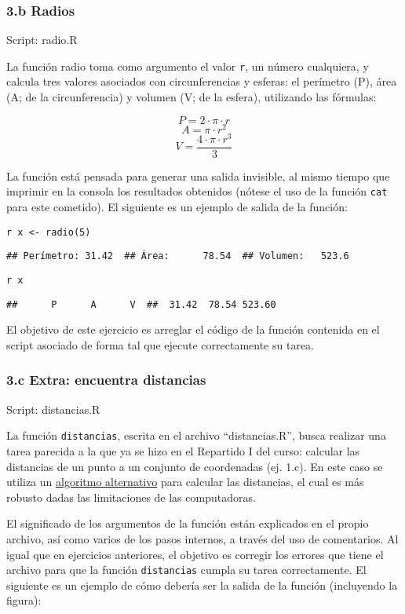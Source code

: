 \documentclass{article}
\begin{document}
\subsubsection{3.b Radios}

Script: radio.R

La función radio toma como argumento el valor \verb!r!, un número
cualquiera, y calcula tres valores asociados con circunferencias y
esferas: el perímetro (P), área (A; de la circunferencia) y volumen (V;
de la esfera), utilizando las fórmulas:

\[
P = 2 \cdot \pi \cdot r
\] \[
A = \pi \cdot r^2
\] \[
V = \frac{4 \cdot \pi \cdot r^3}{3}
\]

La función está pensada para generar una salida invisible, al mismo
tiempo que imprimir en la consola los resultados obtenidos (nótese el
uso de la función \verb!cat! para este cometido). El siguiente es un
ejemplo de salida de la función:

\verb!r x <- radio(5)!

\verb!## Perímetro: 31.42  ## Área:      78.54  ## Volumen:   523.6!

\verb!r x!

\verb!##      P      A      V  ##  31.42  78.54 523.60!

El objetivo de este ejercicio es arreglar el código de la función
contenida en el script asociado de forma tal que ejecute correctamente
su tarea.

\subsubsection{3.c Extra: encuentra distancias}

Script: distancias.R

La función \verb!distancias!, escrita en el archivo ``distancias.R'',
busca realizar una tarea parecida a la que ya se hizo en el Repartido I
del curso: calcular las distancias de un punto a un conjunto de
coordenadas (ej. 1.c). En este caso se utiliza un
\href{http://www.johndcook.com/blog/2010/06/02/whats-so-hard-about-finding-a-hypotenuse/}{algoritmo
alternativo} para calcular las distancias, el cual es más robusto dadas
las limitaciones de las computadoras.

El significado de los argumentos de la función están explicados en el
propio archivo, así como varios de los pasos internos, a través del uso
de comentarios. Al igual que en ejercicios anteriores, el objetivo es
corregir los errores que tiene el archivo para que la función
\verb!distancias! cumpla su tarea correctamente. El siguiente es un
ejemplo de cómo debería ser la salida de la función (incluyendo la
figura):
\end{document}
